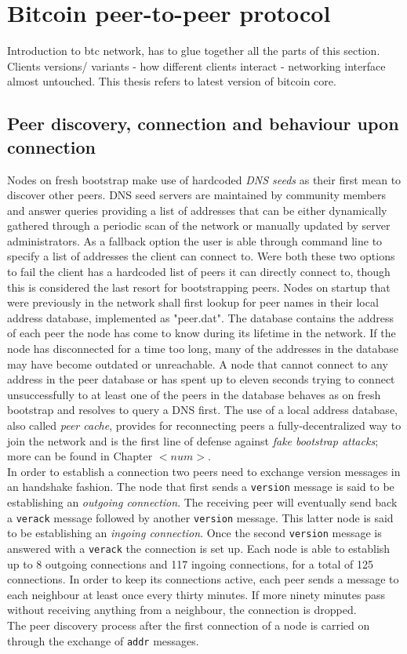 \documentclass[12pt, letterpaper, twoside]{article}
\title{}
\author{}
\begin{document}
\maketitle

\section{Bitcoin peer-to-peer protocol}
Introduction to btc network, has to glue together all the parts of this section. Clients versions/ variants - how different clients interact - networking interface almost untouched. This thesis refers to latest version of bitcoin core.
\subsection{Peer discovery, connection and behaviour upon connection}
Nodes on fresh bootstrap make use of hardcoded \emph{DNS seeds} as their first mean to discover other peers. DNS seed servers are maintained by community members and answer queries providing a list of addresses that can be either dynamically gathered through a periodic scan of the network or manually updated by server administrators. As a fallback option the user is able through command line to specify a list of addresses the client can connect to. Were both these two options to fail the client has a hardcoded list of peers it can directly connect to, though this is considered the last resort for bootstrapping peers. Nodes on startup that were previously in the network shall first lookup for peer names in their local address database, implemented as "peer.dat". The database contains the address of each peer the node has come to know during its lifetime in the network. If the node has disconnected for a time too long, many of the addresses in the database may have become outdated or unreachable. A node that cannot connect to any address in the peer database or has spent up to eleven seconds trying to connect unsuccessfully to at least one of the peers in the database behaves as on fresh bootstrap and resolves to query a DNS first. The use of a local address database, also called \emph{peer cache}, provides for reconnecting peers a fully-decentralized way to join the network and is the first line of defense against \emph{fake bootstrap attacks}; more can be found in Chapter $<num>$.\\
In order to establish a connection two peers need to exchange version messages in an handshake fashion. The node that first sends a \texttt{version} message is said to be establishing an \emph{outgoing connection}. The receiving peer will eventually send back a \texttt{verack} message followed by another \texttt{version} message. This latter node is said to be establishing an \emph{ingoing connection}. Once the second \texttt{version} message is answered with a \texttt{verack} the connection is set up. Each node is able to establish up to 8 outgoing connections and 117 ingoing connections, for a total of 125 connections. In order to keep its connections active, each peer sends a message to each neighbour at least once every thirty minutes. If more ninety minutes pass without receiving anything from a neighbour, the connection is dropped.\\
The peer discovery process after the first connection of a node is carried on through the exchange of \texttt{addr} messages.
\end{document}
